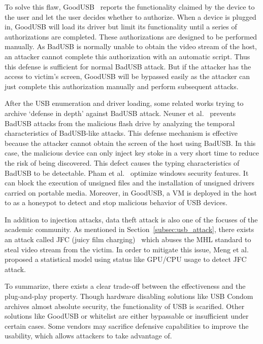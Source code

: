 To solve this flaw, GoodUSB~\cite{tian2015defending} reports the functionality claimed
by the device to the user and let the user decides whether to authorize. When a device
is plugged in, GoodUSB will load its driver but limit its functionality until a
series of authorizations are completed. These authorizations are designed to be
performed manually. As BadUSB is normally unable to obtain the video stream of
the host, an attacker cannot complete this authorization with
an automatic script. Thus this defense is sufficient for normal BadUSB attack. But
if the attacker has the access to victim's screen, GoodUSB will be bypassed
easily as the attacker can just complete this authorization manually and
perform subsequent attacks.

After the USB enumeration and driver loading, some related works
trying to archive `defense in depth'
against BadUSB attack.  Neuner et 
al.~\cite{neuner2018usblock}
prevents BadUSB attacks from the malicious flash drive by analyzing
the temporal characteristics of BadUSB-like attacks. This defense mechanism is
effective because the attacker cannot obtain the screen of the host using
BadUSB. In this case, the malicious device can only inject key stoke in a very
short time to reduce the risk of being discovered. This defect causes the
typing characteristics of BadUSB to be detectable. Pham et
al.~\cite{pham2010optimizing} optimize windows security features. It can
block the execution of unsigned files and the installation of unsigned drivers
carried on portable media. Moreover, in GoodUSB, a VM is deployed in the host to as
a honeypot to detect and stop malicious behavior of USB devices.

In addition to injection attacks, data theft attack is also one of the focuses
of the academic community. As mentioned in Section~\ref{subsec:usb_attack}, there
exists an attack called JFC (juicy film charging)~\cite{JFC} which abuses the MHL
standard to steal video stream from the victim. In order to mitigate this
issue, Meng et al.~\cite{meng2018252} proposed a statistical model using status
like GPU/CPU usage to detect JFC attack.

To summarize, there exists a clear trade-off between the effectiveness and the
plug-and-play property. Though hardware disabling solutions like USB Condom
archives almost absolute security, the functionality of USB is scarified.
Other solutions like GoodUSB or whitelist are either bypassable or insufficient
under certain cases.  Some vendors may sacrifice defensive capabilities to
improve the usability, which allows attackers to take advantage of.

